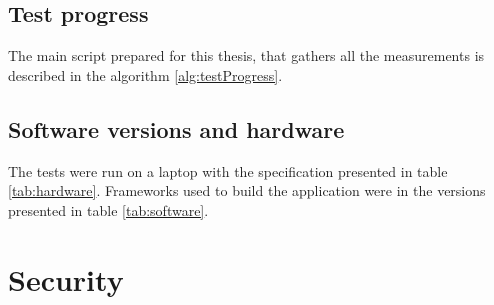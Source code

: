 \subsection{Test progress}

The main script prepared for this thesis, that gathers all the measurements is described in the algorithm \ref{alg:testProgress}.



\subsection{Software versions and hardware}

The tests were run on a laptop with the specification presented in table \ref{tab:hardware}.
Frameworks used to build the application were in the versions presented in table \ref{tab:software}.





\section{Security}
